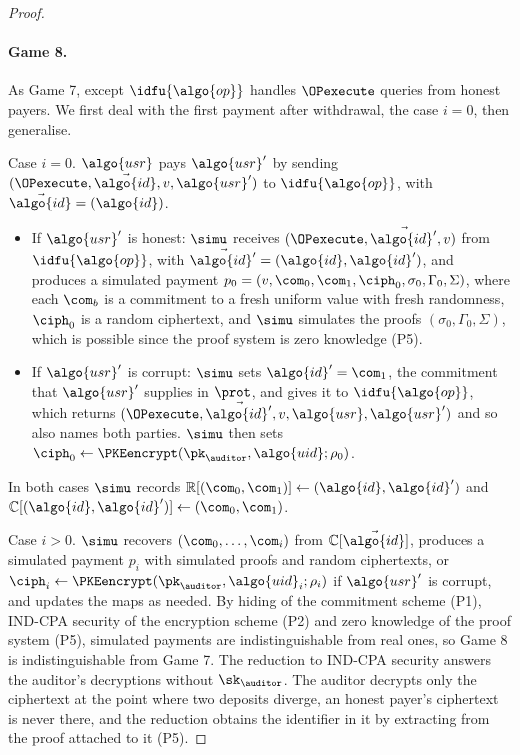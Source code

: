 \begin{proof}
\paragraph{Game 8.} As Game 7, except $\idfu{\algo{op}}$ handles $\OPexecute$
queries from honest payers. We first deal with the first payment after
withdrawal, the case $i = 0$, then generalise.

Case $i = 0$. $\algo{usr}$ pays $\algo{usr}'$ by sending $(\OPexecute,
\vec{\algo{id}}, v, \algo{usr}')$ to $\idfu{\algo{op}}$, with $\vec{\algo{id}} =
(\algo{id})$.

\begin{itemize}

  \item If $\algo{usr}'$ is honest: $\simu$ receives $(\OPexecute,
\vec{\algo{id}'}, v)$ from $\idfu{\algo{op}}$, with $\vec{\algo{id}'} =
(\algo{id}, \algo{id}')$, and produces a simulated payment $p_0 = (v,
\com_0, \com_1, \ciph_0, \sigma_0, \Gamma_0, \Sigma)$, where each $\com_b$ is a
commitment to a fresh uniform value with fresh randomness, $\ciph_0$ is a
random ciphertext, and $\simu$ simulates the proofs $(\sigma_0, \Gamma_0,
\Sigma)$, which is possible since the proof system is zero knowledge (P5).

  \item If $\algo{usr}'$ is corrupt: $\simu$ sets $\algo{id}' = \com_1$, the
commitment that $\algo{usr}'$ supplies in $\prot$, and gives it to
$\idfu{\algo{op}}$, which returns $(\OPexecute, \vec{\algo{id}'}, v, \algo{usr},
\algo{usr}')$ and so also names both parties. $\simu$ then sets $\ciph_0
\leftarrow \PKEencrypt(\pk_\auditor, \algo{uid}; \rho_0)$.

\end{itemize}

In both cases $\simu$ records $\mathbb{R}[(\com_0, \com_1)] \gets (\algo{id}, \algo{id}')$
and $\mathbb{C}[(\algo{id}, \algo{id}')] \gets (\com_0, \com_1)$.

Case $i > 0$. $\simu$ recovers $(\com_0, \ldots, \com_i)$ from
$\mathbb{C}[\vec{\algo{id}}]$, produces a simulated payment $p_i$ with simulated
proofs and random ciphertexts, or $\ciph_i \leftarrow \PKEencrypt(\pk_\auditor,
\algo{uid}_i; \rho_i)$ if $\algo{usr}'$ is corrupt, and updates the maps as
needed. By hiding of the commitment scheme (P1), IND-CPA security of the
encryption scheme (P2) and zero knowledge of the proof system (P5), simulated payments are indistinguishable from real ones,
so Game 8 is indistinguishable from Game 7. The reduction to IND-CPA security
answers the auditor's decryptions without $\sk_\auditor$. The auditor decrypts
only the ciphertext at the point where two deposits diverge, an honest payer's
ciphertext is never there, and the reduction obtains the identifier in it by
extracting from the proof attached to it (P5).


\end{proof}

